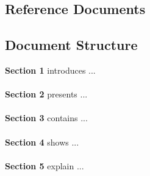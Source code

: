 \subsection{Reference
Documents}

\subsection{Document
Structure}

\textbf{Section 1} introduces ...\\\\
\textbf{Section 2} presents ...\\\\
\textbf{Section 3} contains ...\\\\
\textbf{Section 4} shows ...\\\\
\textbf{Section 5} explain ...\\